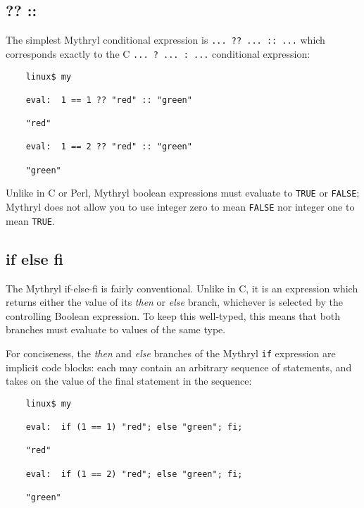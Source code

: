 
\subsection{?? ::}
\label{section:ref:conditionals:what-else}

The simplest Mythryl conditional expression is {\tt ... ?? ... :: ...} which 
corresponds exactly to the C  {\tt ... ? ... : ...} conditional expression:

\begin{verbatim}
    linux$ my

    eval:  1 == 1 ?? "red" :: "green"

    "red"

    eval:  1 == 2 ?? "red" :: "green"

    "green"
\end{verbatim}

Unlike in C or Perl, Mythryl boolean expressions must evaluate to {\tt TRUE} or 
{\tt FALSE};  Mythryl does not allow you to use integer zero to 
mean {\tt FALSE} nor integer one to mean {\tt TRUE}.

\cutend*



\subsection{if else fi}
\label{section:ref:conditionals:if-else-fi}

The Mythryl if-else-fi is fairly conventional.  Unlike in C, it is 
an expression which returns either the value of its {\it then} or 
{\it else} branch, whichever is selected by the controlling Boolean 
expression.  To keep this well-typed, this means that both branches 
must evaluate to values of the same type.

For conciseness, the {\it then} and {\it else} branches of the 
Mythryl {\tt if} expression are implicit code blocks: each may 
contain an arbitrary sequence of statements, and takes on the 
value of the final statement in the sequence:

\begin{verbatim}
    linux$ my

    eval:  if (1 == 1) "red"; else "green"; fi;

    "red"

    eval:  if (1 == 2) "red"; else "green"; fi;

    "green"
\end{verbatim}

